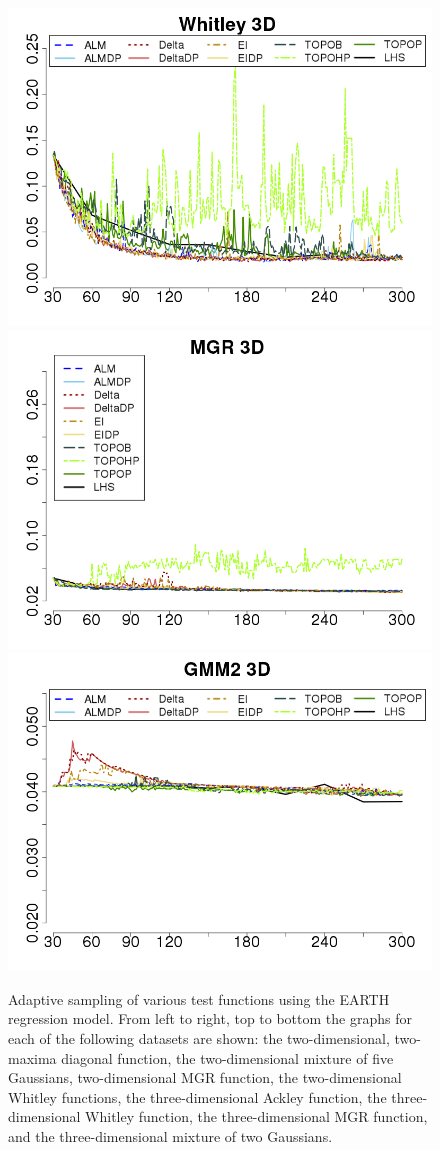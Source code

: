 \begin{figure}[t]
\begin{center}
 \includegraphics[width=0.45\linewidth]{figs/chap5/earth_Whitley_td=30}
 \includegraphics[width=0.45\linewidth]{figs/chap5/earth_MGR_td=30}
 \includegraphics[width=0.45\linewidth]{figs/chap5/earth_GMM2_3D_td=30}
 \caption{Adaptive sampling of various test functions using the EARTH regression model.
 From left to right, top to bottom the graphs for each of the following datasets are shown: the two-dimensional, two-maxima diagonal function, the two-dimensional mixture of five Gaussians, two-dimensional MGR function, the two-dimensional Whitley functions, the three-dimensional Ackley function, the three-dimensional Whitley function, the three-dimensional MGR function, and the three-dimensional mixture of two Gaussians.}
\label{fig:earth_results}
\end{center}
\end{figure}

